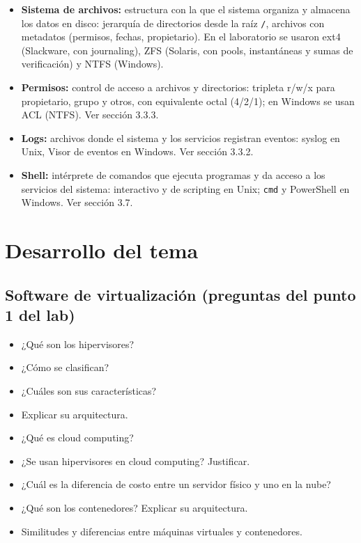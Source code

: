 \documentclass[11pt,a4paper]{report}
\begin{document}
\begin{itemize}
  \item \textbf{Sistema de archivos:} estructura con la que el sistema organiza y almacena los datos en disco: jerarquía de directorios desde la raíz \texttt{/}, archivos con metadatos (permisos, fechas, propietario). En el laboratorio se usaron ext4 (Slackware, con journaling), ZFS (Solaris, con pools, instantáneas y sumas de verificación) y NTFS (Windows).
  \item \textbf{Permisos:} control de acceso a archivos y directorios: tripleta r/w/x para propietario, grupo y otros, con equivalente octal (4/2/1); en Windows se usan ACL (NTFS). Ver sección 3.3.3.
  \item \textbf{Logs:} archivos donde el sistema y los servicios registran eventos: syslog en Unix, Visor de eventos en Windows. Ver sección 3.3.2.
  \item \textbf{Shell:} intérprete de comandos que ejecuta programas y da acceso a los servicios del sistema: interactivo y de scripting en Unix; \texttt{cmd} y PowerShell en Windows. Ver sección 3.7.
\end{itemize}

\section{Desarrollo del tema}

\subsection{Software de virtualización (preguntas del punto 1 del lab)}

\begin{itemize}
  \item ¿Qué son los hipervisores?
  \item ¿Cómo se clasifican?
  \item ¿Cuáles son sus características?
  \item Explicar su arquitectura.
  \item ¿Qué es cloud computing?
  \item ¿Se usan hipervisores en cloud computing? Justificar.
  \item ¿Cuál es la diferencia de costo entre un servidor físico y uno en la nube?
  \item ¿Qué son los contenedores? Explicar su arquitectura.
  \item Similitudes y diferencias entre máquinas virtuales y contenedores.
\end{itemize}
\end{document}
